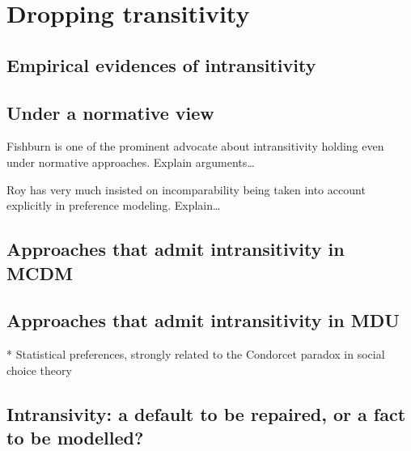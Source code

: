 \documentclass[french, english]{llncs}
\begin{document}
	\section{Dropping transitivity}
	
	\subsection{Empirical evidences of intransitivity}
	
	\subsection{Under a normative view}
	Fishburn is one of the prominent advocate about intransitivity holding even under normative approaches. Explain arguments…
	
	Roy has very much insisted on incomparability being taken into account explicitly in preference modeling. Explain…
	
	\subsection{Approaches that admit intransitivity in MCDM}
	
	\subsection{Approaches that admit intransitivity in MDU}
	
	* Statistical preferences, strongly related to the Condorcet paradox in social choice theory
	
	\subsection{Intransivity: a default to be repaired, or a fact to be modelled?}
	

\end{document}
